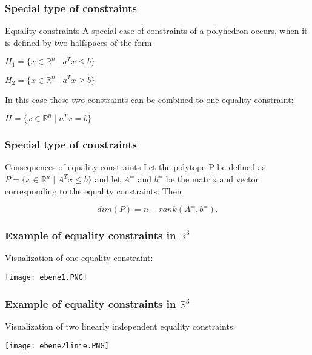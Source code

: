 \documentclass[xcolor=dvipsnames]{beamer}
\numberwithin{bsp}{section}
\numberwithin{figure}{section}
\begin{document}
\begin{frame}
	\frametitle{Special type of constraints}
	\begin{block}{Equality constraints}
		A special case of constraints of a polyhedron occurs, when it is defined by two halfspaces of the form 
		\begin{center}
			$H_{1}=\{ x \in \mathbb{R}^{n}\mid a^{T}x \leq b \}$
			
			\vspace{10 pt}
			
			$H_{2}=\{ x \in \mathbb{R}^{n}\mid a^{T}x \geq b \}$
		\end{center}
		
		In this case these two constraints can be combined to one equality constraint:
		
		\begin{center}
			$H=\{ x \in \mathbb{R}^{n}\mid a^{T}x = b \}$
			
			\vspace{10 pt}
			
		\end{center}
		
	\end{block}
\end{frame}

\begin{frame}
	\frametitle{Special type of constraints}
	\begin{block}{Consequences of equality constraints}
		Let the polytope P be defined as $P=\{x \in \mathbb{R}^{n}\mid A^{T}x \leq b \}$ and let $A^{=} $ and $b^{=}$ be the matrix and vector corresponding to the equality constraints. Then
		
		\begin{equation*}
		dim(P) = n - rank(A^{=},b^{=}).
		\end{equation*}
		
		\vspace{10 pt}
	\end{block}
\end{frame}

\begin{frame}
	\frametitle{Example of equality constraints in $\mathbb{R}^{3}$}
	Visualization of one equality constraint:
	\begin{center}
		\texttt{[image: ebene1.PNG]}
	\end{center} 
\end{frame}

\begin{frame}
	\frametitle{Example of equality constraints in $\mathbb{R}^{3}$}
	Visualization of two linearly independent equality constraints:
	\begin{center}
		\texttt{[image: ebene2linie.PNG]}
	\end{center} 
\end{frame}
\end{document}
